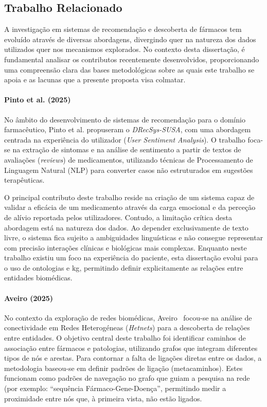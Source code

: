 \subsection{Trabalho Relacionado}
\label{sec:related works}
A investigação em sistemas de recomendação e descoberta de fármacos tem evoluído através de diversas abordagens, divergindo quer na natureza dos dados utilizados quer nos mecanismos explorados. No contexto desta dissertação, é fundamental analisar os contributos recentemente desenvolvidos, proporcionando uma compreensão clara das bases metodológicas sobre as quais este trabalho se apoia e as lacunas que a presente proposta visa colmatar.


\paragraph{Pinto et al. (2025)}
No âmbito do desenvolvimento de sistemas de recomendação para o domínio farmacêutico, Pinto et al. \cite{pinto2025} propuseram o \emph{DRecSys-SUSA}, com uma abordagem centrada na experiência do utilizador (\emph{User Sentiment Analysis}). O trabalho foca-se na extração de sintomas e na análise de sentimento a partir de textos de avaliações (\emph{reviews}) de medicamentos, utilizando técnicas de Processamento de Linguagem Natural (NLP) para converter casos não estruturados em sugestões terapêuticas.

O principal contributo deste trabalho reside na criação de um sistema capaz de validar a eficácia de um medicamento através da carga emocional e da perceção de alívio reportada pelos utilizadores. Contudo, a limitação crítica desta abordagem está na natureza dos dados. Ao depender exclusivamente de texto livre, o sistema fica sujeito a ambiguidades linguísticas e não consegue representar com precisão interações clínicas e biológicas mais complexas. Enquanto neste trabalho existiu um foco na experiência do paciente, esta dissertação evolui para o uso de ontologias e \acrshort{kg}, permitindo definir explicitamente as relações entre entidades biomédicas.

\paragraph{Aveiro (2025)}
No contexto da exploração de redes biomédicas, Aveiro~\cite{aveiro2025} focou-se na análise de conectividade em Redes Heterogéneas (\emph{Hetnets}) para a descoberta de relações entre entidades. O objetivo central deste trabalho foi identificar caminhos de associação entre fármacos e patologias, utilizando grafos que integram diferentes tipos de nós e arestas. Para contornar a falta de ligações diretas entre os dados, a metodologia baseou-se em definir padrões de ligação (metacaminhos). Estes funcionam como padrões de navegação no grafo que guiam a pesquisa na rede (por exemplo: \enquote{sequência Fármaco-Gene-Doença}, permitindo medir a proximidade entre nós que, à primeira vista, não estão ligados.

